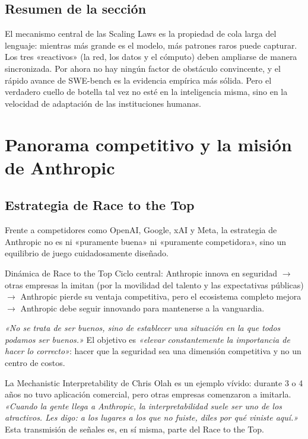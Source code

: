 \documentclass[a4paper]{article}
\begin{document}
\subsection{Resumen de la sección}

El mecanismo central de las Scaling Laws es la propiedad de cola larga del lenguaje: mientras más grande es el modelo, más patrones raros puede capturar. Los tres «reactivos» (la red, los datos y el cómputo) deben ampliarse de manera sincronizada. Por ahora no hay ningún factor de obstáculo convincente, y el rápido avance de SWE-bench es la evidencia empírica más sólida. Pero el verdadero cuello de botella tal vez no esté en la inteligencia misma, sino en la velocidad de adaptación de las instituciones humanas.
\section{Panorama competitivo y la misión de Anthropic}

\subsection{Estrategia de Race to the Top}

Frente a competidores como OpenAI, Google, xAI y Meta, la estrategia de Anthropic no es ni «puramente buena» ni «puramente competidora», sino un equilibrio de juego cuidadosamente diseñado.

\begin{importantbox}{Dinámica de Race to the Top}
Ciclo central: Anthropic innova en seguridad $\to$ otras empresas la imitan (por la movilidad del talento y las expectativas públicas) $\to$ Anthropic pierde su ventaja competitiva, pero el ecosistema completo mejora $\to$ Anthropic debe seguir innovando para mantenerse a la vanguardia.

\textit{«No se trata de ser buenos, sino de establecer una situación en la que todos podamos ser buenos.»} El objetivo es \textit{«elevar constantemente la importancia de hacer lo correcto»}: hacer que la seguridad sea una dimensión competitiva y no un centro de costos.

La Mechanistic Interpretability de Chris Olah es un ejemplo vívido: durante 3 o 4 años no tuvo aplicación comercial, pero otras empresas comenzaron a imitarla. \textit{«Cuando la gente llega a Anthropic, la interpretabilidad suele ser uno de los atractivos. Les digo: a los lugares a los que no fuiste, diles por qué viniste aquí.»} Esta transmisión de señales es, en sí misma, parte del Race to the Top.
\end{importantbox}
\end{document}
